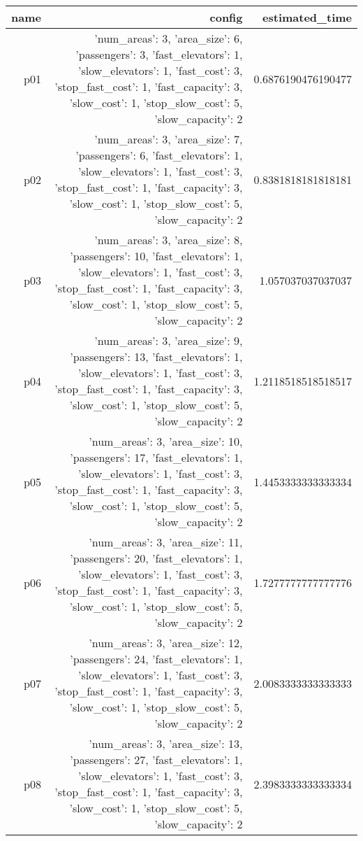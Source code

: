 \documentclass{article}
\begin{document}
                            \begin{center}
                            \scriptsize
                            \begin{tabular}{r|r|r}
                            name & config & estimated\_time\\\midrule
                              p01&{'num\_areas': 3, 'area\_size': 6, 'passengers': 3, 'fast\_elevators': 1, 'slow\_elevators': 1, 'fast\_cost': 3, 'stop\_fast\_cost': 1, 'fast\_capacity': 3, 'slow\_cost': 1, 'stop\_slow\_cost': 5, 'slow\_capacity': 2}&0.6876190476190477\\
  p02&{'num\_areas': 3, 'area\_size': 7, 'passengers': 6, 'fast\_elevators': 1, 'slow\_elevators': 1, 'fast\_cost': 3, 'stop\_fast\_cost': 1, 'fast\_capacity': 3, 'slow\_cost': 1, 'stop\_slow\_cost': 5, 'slow\_capacity': 2}&0.8381818181818181\\
  p03&{'num\_areas': 3, 'area\_size': 8, 'passengers': 10, 'fast\_elevators': 1, 'slow\_elevators': 1, 'fast\_cost': 3, 'stop\_fast\_cost': 1, 'fast\_capacity': 3, 'slow\_cost': 1, 'stop\_slow\_cost': 5, 'slow\_capacity': 2}&1.057037037037037\\
  p04&{'num\_areas': 3, 'area\_size': 9, 'passengers': 13, 'fast\_elevators': 1, 'slow\_elevators': 1, 'fast\_cost': 3, 'stop\_fast\_cost': 1, 'fast\_capacity': 3, 'slow\_cost': 1, 'stop\_slow\_cost': 5, 'slow\_capacity': 2}&1.2118518518518517\\
  p05&{'num\_areas': 3, 'area\_size': 10, 'passengers': 17, 'fast\_elevators': 1, 'slow\_elevators': 1, 'fast\_cost': 3, 'stop\_fast\_cost': 1, 'fast\_capacity': 3, 'slow\_cost': 1, 'stop\_slow\_cost': 5, 'slow\_capacity': 2}&1.4453333333333334\\
  p06&{'num\_areas': 3, 'area\_size': 11, 'passengers': 20, 'fast\_elevators': 1, 'slow\_elevators': 1, 'fast\_cost': 3, 'stop\_fast\_cost': 1, 'fast\_capacity': 3, 'slow\_cost': 1, 'stop\_slow\_cost': 5, 'slow\_capacity': 2}&1.7277777777777776\\
  p07&{'num\_areas': 3, 'area\_size': 12, 'passengers': 24, 'fast\_elevators': 1, 'slow\_elevators': 1, 'fast\_cost': 3, 'stop\_fast\_cost': 1, 'fast\_capacity': 3, 'slow\_cost': 1, 'stop\_slow\_cost': 5, 'slow\_capacity': 2}&2.0083333333333333\\
  p08&{'num\_areas': 3, 'area\_size': 13, 'passengers': 27, 'fast\_elevators': 1, 'slow\_elevators': 1, 'fast\_cost': 3, 'stop\_fast\_cost': 1, 'fast\_capacity': 3, 'slow\_cost': 1, 'stop\_slow\_cost': 5, 'slow\_capacity': 2}&2.3983333333333334\\

\end{tabular}
\end{center}
\end{document}
